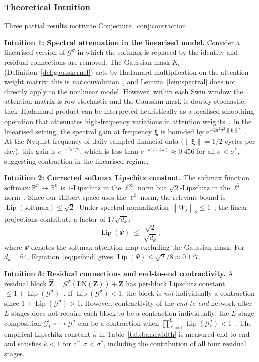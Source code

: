 \documentclass[11pt,a4paper]{article}  %
\DeclareMathOperator{\Lip}{Lip}
\newcommand{\R}{\mathbb{R}}
\newcommand{\Gop}{\mathcal{G}^{\sigma}}
\newcommand{\norm}[1]{\left\lVert#1\right\rVert}
\theoremstyle{plain}
\theoremstyle{definition}
\theoremstyle{remark}
\begin{document}
\subsubsection{Theoretical Intuition}
\label{subsubsec:intuition}

Three partial results motivate Conjecture~\ref{conj:contraction}.

\medskip\noindent\textbf{Intuition 1: Spectral attenuation in the linearised model.}
Consider a linearised version of $\Gop$ in which the softmax is replaced
by the identity and residual connections are removed. The Gaussian
mask $K_\sigma$ (Definition~\ref{def:gausskernel}) acts by Hadamard
multiplication on the attention weight matrix; this is \emph{not}
convolution~\cite{Horn1990}, and Lemma~\ref{lem:spectral} does not
directly apply to the nonlinear model. However, within each Swin
window the attention matrix is row-stochastic and the Gaussian mask
is doubly stochastic; their Hadamard product can be interpreted
heuristically as a localised smoothing operation that attenuates
high-frequency variations in attention weights~\cite{Rasmussen2006}.
In the linearised setting, the spectral gain at frequency
$\boldsymbol{\xi}$ is bounded by
$e^{-2\pi^2\sigma^2\norm{\boldsymbol{\xi}}^2}$~\cite{Stein2003}.
At the Nyquist frequency of daily-sampled financial data
($\norm{\boldsymbol{\xi}} = 1/2$ cycles per day), this gain is
$e^{-\pi^2\sigma^2/2}$, which is less than $e^{-\pi^2/(4\pi)}
\approx 0.456$ for all $\sigma < \sigma^*$, suggesting contraction
in the linearised regime.

\medskip\noindent\textbf{Intuition 2: Corrected softmax Lipschitz constant.}
The softmax function $\mathrm{softmax}:\R^n\to\R^n$ is $1$-Lipschitz
in the $\ell^\infty$ norm but $\sqrt{2}$-Lipschitz in the $\ell^2$
norm~\cite{Gao2017}. Since our Hilbert space uses the $\ell^2$ norm,
the relevant bound is $\Lip(\mathrm{softmax}) \leq \sqrt{2}$.
Under spectral normalization $\norm{W_j}_2\leq 1$~\cite{Miyato2018},
the linear projections contribute a factor of $1/\sqrt{d_k}$:
\begin{equation}
   \Lip(\Psi) \;\leq\; \frac{\sqrt{2}}{\sqrt{d_k}},
   \label{eq:psibnd}
\end{equation}
where $\Psi$ denotes the softmax attention map excluding the Gaussian
mask. For $d_k = 64$, Equation~\eqref{eq:psibnd} gives
$\Lip(\Psi) \leq \sqrt{2}/8 \approx 0.177$.

\medskip\noindent\textbf{Intuition 3: Residual connections and end-to-end contractivity.}
A residual block $\hat{\mathbf{Z}} = \Gop(\mathrm{LN}(\mathbf{Z})) + \mathbf{Z}$
has per-block Lipschitz constant $\leq 1 + \Lip(\Gop)$~\cite{Behrmann2019}.
If $\Lip(\Gop) < 1$, the block is \emph{not} individually a
contraction since $1 + \Lip(\Gop) > 1$. However, contractivity of
the \emph{end-to-end} network after $L$ stages does not require
each block to be a contraction individually: the $L$-stage composition
$\Gop_L \circ \cdots \circ \Gop_1$ can be a contraction when
$\prod_{\ell=1}^L \Lip(\Gop_\ell) < 1$~\cite{Krantz2002}. The
empirical Lipschitz constant $\hat{\kappa}$ in Table~\ref{tab:bandwidth}
is measured end-to-end and satisfies $\hat{\kappa} < 1$ for all
$\sigma < \sigma^*$, including the contribution of all four
residual stages.
\end{document}
